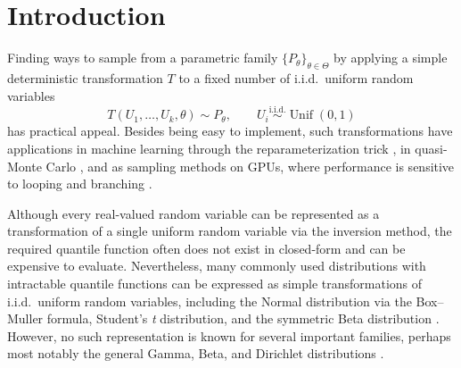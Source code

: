 \documentclass[11pt]{article}
\title{\paperTitle}
\author{Dylan Greaves\\\texttt{dgreaves103@gmail.com}}
\date{}
\theoremstyle{plain}
\theoremstyle{remark}
\begin{document}
\maketitle
\begin{abstract}
We present an explicit deterministic transformation of a fixed number of i.i.d.\ uniform random variables with exact $\operatorname{Beta}(a,1-a)$ law for $0<a<1$, using only elementary operations (an ``extended one-liner'', see \cite{devroye1996oneline}).
As corollaries, the families $\operatorname{Beta}(a,b)$ with $\min(a,b)<1$, $\operatorname{Gamma}(c)$ with $c<1$, and $\operatorname{Dirichlet}(\alpha_1,\dots,\alpha_d)$ with $0<\alpha_i<1$, for fixed $d$, also have extended one-liners.
\end{abstract}

\section{Introduction}
\label{sec:intro}


Finding ways to sample from a parametric family $\{P_\theta\}_{\theta\in\Theta}$ by applying a simple deterministic transformation $T$ to a fixed number of i.i.d.\ uniform random variables
\[
T(U_1,\dots,U_k, \theta)\sim P_\theta, \qquad U_i\overset{\mathrm{i.i.d.}}{\sim}\operatorname{Unif}(0,1)
\]
has practical appeal.
Besides being easy to implement, such transformations have applications in machine learning through the reparameterization trick \cite{figurnov2018implicit,mohamed2020montecarlo}, in quasi-Monte Carlo \cite{practicalqmc},
and as sampling methods on GPUs, where performance is sensitive to looping and branching \cite{howes2007cuda}.

Although every real-valued random variable can be represented as a transformation of a single uniform random variable via the inversion method, the required quantile function often does not exist in closed-form and can be expensive to evaluate.
Nevertheless, many commonly used distributions with intractable quantile functions can be expressed as simple transformations of i.i.d.\ uniform random variables, including the Normal distribution via the Box--Muller formula, Student's \textit{t} distribution, and the symmetric Beta distribution \cite{devroye1996oneline}.
However, no such representation is known for several important families, perhaps most notably the general Gamma, Beta, and Dirichlet distributions \cite{devroye1996oneline,devroyejames2014stable,figurnov2018implicit}.
\end{document}
